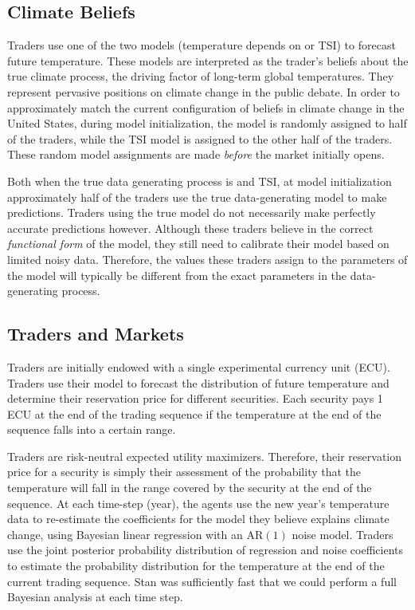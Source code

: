 \documentclass{wscpaperproc}\usepackage[]{graphicx}\usepackage[]{color}
\newcommand{\AR}{\text{AR}}
\begin{document}
\subsection{Climate Beliefs}

Traders use one of the two models (temperature depends on  or TSI) to forecast future temperature. 
These models are interpreted as the trader's beliefs about the true climate process, the driving factor of long-term global temperatures. 
They represent pervasive positions on climate change in the public debate. In order to approximately match the current configuration of beliefs in climate change in the United States, during model initialization, the  model is randomly assigned to half of the traders, while the TSI model is assigned to the other half of the traders. These random model assignments are made \emph{before} the market initially opens.

Both when the true data generating process is  and TSI, at model initialization approximately half of the traders use the true data-generating model to make predictions. 
Traders using the true model do not necessarily make perfectly accurate predictions however. 
Although these traders believe in the correct \emph{functional form\/} of the model, they still need to calibrate their model based on limited noisy data. 
Therefore, the values these traders assign to the parameters of the model will typically be different from the exact parameters in the data-generating process.

\subsection{Traders and Markets}

Traders are initially endowed with a single experimental currency unit (ECU). 
Traders use their model to forecast the distribution of future temperature and determine their reservation price for different securities. Each security pays 1 ECU at the end of the trading sequence if the temperature at the end of the sequence falls into a certain range.

Traders are risk-neutral expected utility maximizers. 
Therefore, their reservation price for a security is simply their assessment of the probability that the temperature will fall in the range covered by the security at the end of the sequence.
At each time-step (year), the agents use the new year's temperature data to re-estimate the coefficients for the model they believe explains climate change, using Bayesian linear regression with an $\AR(1)$ noise model. Traders use the joint posterior probability distribution of regression and noise coefficients to estimate the probability distribution for the  temperature at the end of the current trading sequence. Stan was sufficiently fast that we could perform a full Bayesian analysis at each time step. 
\end{document}

